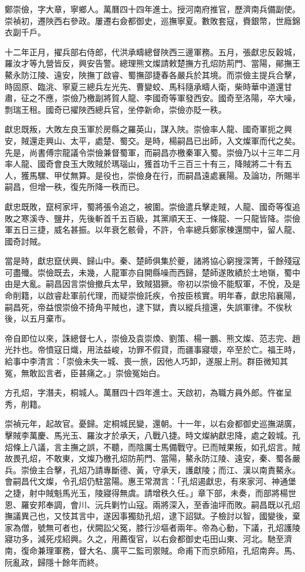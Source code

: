 \begin{pinyinscope}
鄭崇儉，字大章，寧鄉人。萬曆四十四年進士。授河南府推官，歷濟南兵備副使。崇禎初，遷陜西右參政。屢遷右僉都御史，巡撫寧夏。數敗套寇，賚銀幣，世廕錦衣副千戶。

十二年正月，擢兵部右侍郎，代洪承疇總督陜西三邊軍務。五月，張獻忠反穀城，羅汝才等九營皆反，興安告警。總理熊文燦請敕楚撫方孔炤防荊門、當陽，鄖撫王鰲永防江陵、遠安，陜撫丁啟睿、蜀撫邵捷春各嚴兵於其境。而崇儉主提兵合擊，時固原、臨洮、寧夏三總兵左光先、曹變蛟、馬科隨承疇人衛，柴時華中道還甘肅，征之不應，崇儉乃檄副將賀人龍、李國奇等軍發西安。國奇至洛陽，卒大噪，剽瑞王租。國奇已擢陜西總兵官，坐停新命，崇儉亦貶一秩。

獻忠既叛，大敗左良玉軍於房縣之羅英山，謀入陜。崇儉率人龍、國奇軍扼之興安，賊還走興山、太平，處楚、蜀交。是時，楊嗣昌已出師，入文燦軍而代之矣。先是，尚書傅宗龍議令崇儉兼督蜀軍，而嗣昌亦檄秦軍入蜀。崇儉乃以十三年二月率人龍、國奇會良玉大敗賊於瑪瑙山，獲首功千三百三十有三，降賊將二十有五人，獲馬騾、甲仗無算。是役也，崇儉身在行，而嗣昌遠處襄陽。及論功，所賜半嗣昌，但增一秩，復先所降一秩而已。

獻忠既敗，竄柯家坪，蜀將張令追之，被圍。崇儉遣兵擊走賊，人龍、國奇等復追敗之寒溪寺、鹽井，先後斬首千五百級，其黨順天王、一條龍、一只龍皆降。崇儉軍五日三捷，威名甚振。以年衰乞骸骨，不許，令率總兵鄭家棟還關中，留人龍、國奇討賊。

當是時，獻忠竄伏興、歸山中。秦、楚師俱集於夔，諸將協心窮搜深箐，千餘殘寇可盡殲。崇儉既去，未幾，人龍軍亦自開縣噪而西歸，楚師遂敗績於土地嶺，蜀中由是大亂。嗣昌因言崇儉撤兵太早，致賊猖獗。帝初以崇儉不能馭軍，不悅，及是命削籍，以啟睿赴軍前代理，而疑崇儉託疾，令按臣核實。明年春，獻忠陷襄陽，嗣昌死，帝益恨崇儉不掎角平賊也，逮下獄，責以縱兵擅還，失誤軍律。不俟秋後，以五月棄市。

帝自即位以來，誅總督七人，崇儉及袁崇煥、劉策、楊一鵬、熊文燦、范志完、趙光抃也。帝憤寇日熾，用法益峻，功罪不假貸，而疆事寢壞，卒至於亡。福王時，給事中李清言：「崇儉未失一城、喪一旅，因他人巧卸，遂服上刑。群臣微知其冤，無敢訟言者，臣甚痛之。」崇儉冤始白。

方孔炤，字潛夫，桐城人。萬曆四十四年進士。天啟初，為職方員外郎。忤崔呈秀，削籍。

崇禎元年，起故官。憂歸。定桐城民變，還朝。十一年，以右僉都御史巡撫湖廣，擊賊李萬慶、馬光玉、羅汝才於承天，八戰八捷。時文燦納獻忠降，處之穀城。孔炤條上八議，言主撫之誤，不聽，而陰厲士馬備戰守。已而賊果叛，如孔炤言。賊故畏孔炤，不敢東，文燦乃檄孔炤防荊門、當陽，鰲永防江陵、遠安，秦、蜀各嚴兵。崇儉主合擊，孔炤乃請專斷德、黃，守承天，護獻陵；而江、漢以南責鰲永。會嗣昌代文燦，令孔炤仍駐當陽。惠王常潤言：「孔炤遏獻忠，有來家河、神通堡之捷，射中賊魁馬光玉，陵寢得無虞。請增秩久任。」章下部，未奏，而部將楊世恩、羅安邦奉調，會川、沅兵剿竹山寇。兩將深入，至香油坪而敗。嗣昌既以孔炤撫議異己也，又忮其言中，遂因事獨劾孔炤，逮下詔獄。子檢討以智，國變後，棄家為僧，號無可者也，伏闕訟父冤，膝行沙塸者兩年。帝為心動，下議，孔炤護陵寢功多，減死戍紹興。久之，用薦復官，以右僉都御史屯田山東、河北。馳至濟南，復命兼理軍務，督大名、廣平二監司禦賊。命甫下而京師陷，孔炤南奔。馬、阮亂政，歸隱十餘年而終。


\end{pinyinscope}
